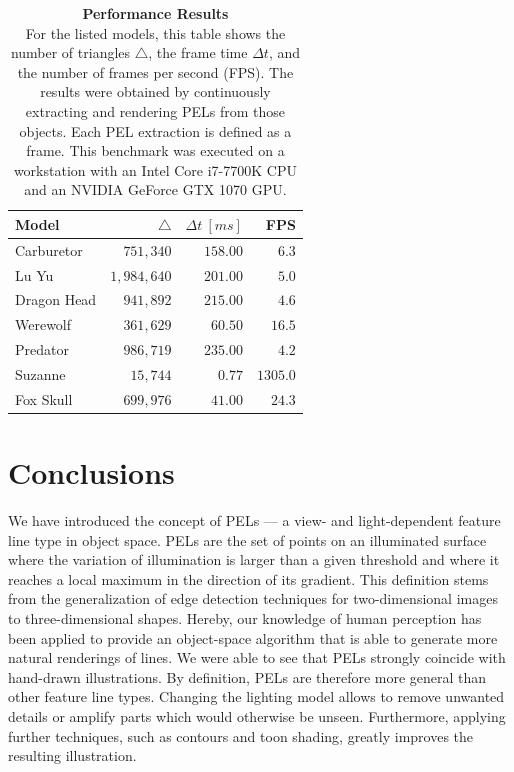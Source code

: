 \documentclass[9pt,fleqn,twoside,twocolumn]{stdglobal}
\begin{document}
    \begin{table}[h]
      \caption{%
        \textbf{Performance Results}\\
        For the listed models, this table shows the number of triangles $\triangle$, the frame time $\Delta t$, and the number of frames per second (FPS).
        The results were obtained by continuously extracting and rendering PELs from those objects.
        Each PEL extraction is defined as a frame.
        This benchmark was executed on a workstation with an
        \textrm{Intel Core i7-7700K} CPU and an
        \textrm{NVIDIA GeForce GTX 1070} GPU.
      }
      \centering
      \footnotesize
      \renewcommand{\arraystretch}{1.2}
      \begin{tabular}{lrrr}
        \hline
        \textbf{Model} & $\triangle$ & $\Delta t\ [ms]$ & \textbf{FPS} \\
        \hline
        \hline
        \rowcolor{mathdefback}
        Carburetor & $751,340$ & $158.00$ & $6.3$ \\
        Lu Yu & $1,984,640$ & $201.00$ & $5.0$ \\
        \rowcolor{mathdefback}
        Dragon Head & $941,892$ & $215.00$ & $4.6$ \\
        Werewolf & $361,629$ & $60.50$ & $16.5$ \\
        \rowcolor{mathdefback}
        Predator & $986,719$ & $235.00$ & $4.2$ \\
        Suzanne & $15,744$ & $0.77$ & $1305.0$ \\
        \rowcolor{mathdefback}
        Fox Skull & $699,976$ & $41.00$ & $24.3$ \\
        \hline
      \end{tabular}
    \end{table}

\section{Conclusions}
  We have introduced the concept of PELs --- a view- and light-dependent feature line type in object space.
  PELs are the set of points on an illuminated surface where the variation of illumination is larger than a given threshold and where it reaches a local maximum in the direction of its gradient.
  This definition stems from the generalization of edge detection techniques for two-dimensional images to three-dimensional shapes.
  Hereby, our knowledge of human perception has been applied to provide an object-space algorithm that is able to generate more natural renderings of lines.
  We were able to see that PELs strongly coincide with hand-drawn illustrations.
  By definition, PELs are therefore more general than other feature line types.
  Changing the lighting model allows to remove unwanted details or amplify parts which would otherwise be unseen.
  Furthermore, applying further techniques, such as contours and toon shading, greatly improves the resulting illustration.
\end{document}
